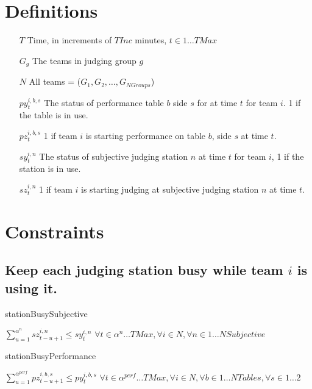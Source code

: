 \documentclass[letterpaper,11pt]{report}
\begin{document}
\section{Definitions}
\begin{itemize}

\item[$T$] Time, in increments of $TInc$ minutes, $t \in 1 \dots TMax$

\item[$G_{g}$] The teams in judging group $g$
\item[$N$] All teams = ($G_{1}, G_{2}, \dots, G_{NGroups}$)

\item[$py_{t}^{i,b,s}$] The status of performance table $b$ side $s$ for
at  time $t$ for team $i$. 1 if the table is in use.  

\item[$pz_{t}^{i,b,s}$] 1 if team $i$ is starting performance on table $b$,
  side $s$ at time $t$.

\item[$sy_{t}^{i,n}$] The status of subjective judging station $n$ at time $t$ for team
  $i$, 1 if the station is in use.

\item[$sz_{t}^{i,n}$] 1 if team $i$ is starting judging at subjective
judging station $n$ at time $t$.


\end{itemize}


\section{Constraints}

\subsection{Keep each judging station busy while team $i$ is using it.}

\begin{algorithm}
\caption{stationBusySubjective}
$\sum\limits_{u=1}^{\alpha^{n}} sz_{t-u+1}^{i,n} \le sy_{t}^{i,n}$
\hfill $\forall t \in \alpha^{n} \dots TMax,
\forall i \in N,
\forall n \in 1 \dots NSubjective$
\end{algorithm}

\begin{algorithm}
\caption{stationBusyPerformance}
$\sum\limits_{u=1}^{\alpha^{perf}} pz_{t-u+1}^{i,b,s} \le py_{t}^{i,b,s}$
\hfill $\forall t \in \alpha^{perf} \dots TMax, 
\forall i \in N, \forall b \in 1 \dots NTables,
\forall s \in 1 \dots 2$
\end{algorithm}
\end{document}
